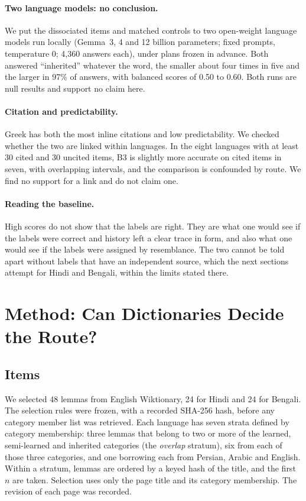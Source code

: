 \documentclass[11pt]{article}
\begin{document}
\paragraph{Two language models: no conclusion.} We put the dissociated items and matched controls to two open-weight language models run locally (Gemma~3, 4 and 12 billion parameters; fixed prompts, temperature 0; 4,360 answers each), under plans frozen in advance. Both answered ``inherited'' whatever the word, the smaller about four times in five and the larger in 97\% of answers, with balanced scores of 0.50 to 0.60. Both runs are null results and support no claim here.

\paragraph{Citation and predictability.} Greek has both the most inline citations and low predictability. We checked whether the two are linked within languages. In the eight languages with at least 30 cited and 30 uncited items, B3 is slightly more accurate on cited items in seven, with overlapping intervals, and the comparison is confounded by route. We find no support for a link and do not claim one.

\paragraph{Reading the baseline.} High scores do not show that the labels are right. They are what one would see if the labels were correct and history left a clear trace in form, and also what one would see if the labels were assigned by resemblance. The two cannot be told apart without labels that have an independent source, which the next sections attempt for Hindi and Bengali, within the limits stated there.

\section{Method: Can Dictionaries Decide the Route?}
\label{sec:method}

\subsection{Items}

We selected 48 lemmas from English Wiktionary, 24 for Hindi and 24 for Bengali. The selection rules were frozen, with a recorded SHA-256 hash, before any category member list was retrieved. Each language has seven strata defined by category membership: three lemmas that belong to two or more of the learned, semi-learned and inherited categories (the \textit{overlap} stratum), six from each of those three categories, and one borrowing each from Persian, Arabic and English. Within a stratum, lemmas are ordered by a keyed hash of the title, and the first $n$ are taken. Selection uses only the page title and its category membership. The revision of each page was recorded.
\end{document}
